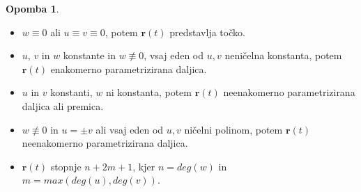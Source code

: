 \documentclass[12pt]{beamer}
\theoremstyle{definition} %
\newtheorem{opomba}[definicija]{Opomba}
\theoremstyle{plain} %
\begin{document}
\begin{frame}
    \begin{opomba}
        \begin{itemize}
            \item  $w\equiv0$ ali $u\equiv v \equiv 0$, potem $\textbf{r}(t)$ predstavlja točko.
            \item $u$, $v$ in $w$ konstante in $w \not\equiv 0$, vsaj eden od $u, v$ neničelna konstanta,
            potem $\textbf{r}(t)$ enakomerno parametrizirana daljica.
            \item $u$ in $v$ konstanti, $w$  ni konstanta, potem $\textbf{r}(t)$ neenakomerno parametrizirana daljica ali premica.
            \item $w \not\equiv 0$ in $u = \pm v$ ali vsaj eden od $u, v$ ničelni polinom, 
            potem $\textbf{r}(t)$ neenakomerno parametrizirana daljica.
            \item $\textbf{r}(t)$ stopnje $n + 2m + 1$, kjer $n = deg(w)$ in $m = max(deg(u),deg(v)).$
        \end{itemize} 
    \end{opomba}
      
\end{frame}


\end{document}

